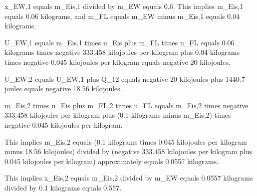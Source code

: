 x_EW,1 equals m_Eis,1 divided by m_EW equals 0.6.  
This implies m_Eis,1 equals 0.06 kilograms, and m_FL equals m_EW minus m_Eis,1 equals 0.04 kilograms.  

U_EW,1 equals m_Eis,1 times u_Eis plus m_FL times u_FL equals 0.06 kilograms times negative 333.458 kilojoules per kilogram plus 0.04 kilograms times negative 0.045 kilojoules per kilogram equals negative 20 kilojoules.  

U_EW,2 equals U_EW,1 plus Q_12 equals negative 20 kilojoules plus 1440.7 joules equals negative 18.56 kilojoules.  

m_Eis,2 times u_Eis plus m_FL,2 times u_FL equals m_Eis,2 times negative 333.458 kilojoules per kilogram plus (0.1 kilograms minus m_Eis,2) times negative 0.045 kilojoules per kilogram.  

This implies m_Eis,2 equals (0.1 kilograms times 0.045 kilojoules per kilogram minus 18.56 kilojoules) divided by (negative 333.458 kilojoules per kilogram plus 0.045 kilojoules per kilogram) approximately equals 0.0557 kilograms.  

This implies x_Eis,2 equals m_Eis,2 divided by m_EW equals 0.0557 kilograms divided by 0.1 kilograms equals 0.557.